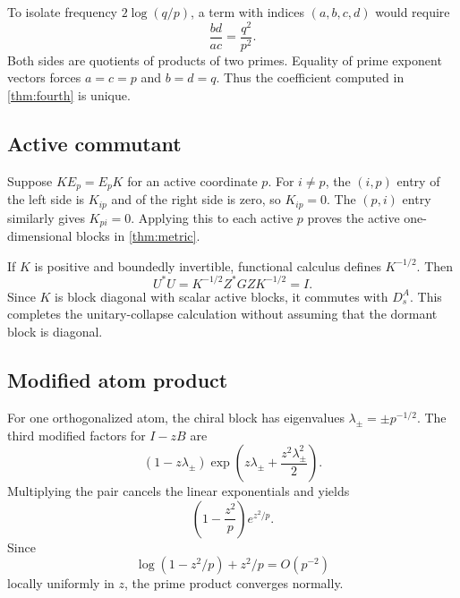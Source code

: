 To isolate frequency $2\log(q/p)$, a term with indices
$(a,b,c,d)$ would require
\[
 \frac{bd}{ac}=\frac{q^2}{p^2}.
\]
Both sides are quotients of products of two primes.  Equality of
prime exponent vectors forces $a=c=p$ and $b=d=q$.  Thus the
coefficient computed in \cref{thm:fourth} is unique.

\subsection{Active commutant}

Suppose $KE_p=E_pK$ for an active coordinate $p$.  For $i\ne p$,
the $(i,p)$ entry of the left side is $K_{ip}$ and of the right side
is zero, so $K_{ip}=0$.  The $(p,i)$ entry similarly gives
$K_{pi}=0$.  Applying this to each active $p$ proves the active
one-dimensional blocks in \cref{thm:metric}.

If $K$ is positive and boundedly invertible, functional calculus
defines $K^{-1/2}$.  Then
\[
 U^*U=K^{-1/2}Z^*GZK^{-1/2}=I.
\]
Since $K$ is block diagonal with scalar active blocks, it commutes with
$D_s^A$.  This completes the unitary-collapse calculation without
assuming that the dormant block is diagonal.

\subsection{Modified atom product}

For one orthogonalized atom, the chiral block has eigenvalues
$\lambda_\pm=\pm p^{-1/2}$.  The third modified factors for
$I-zB$ are
\[
 (1-z\lambda_\pm)
 \exp\left(z\lambda_\pm+\frac{z^2\lambda_\pm^2}{2}\right).
\]
Multiplying the pair cancels the linear exponentials and yields
\[
 \left(1-\frac{z^2}{p}\right)e^{z^2/p}.
\]
Since
\[
 \log(1-z^2/p)+z^2/p=O(p^{-2})
\]
locally uniformly in $z$, the prime product converges normally.
